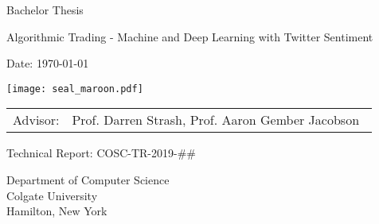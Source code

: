 \documentclass[../thesis.tex]{subfiles}
\begin{document}
\pagestyle{empty}

\begin{titlepage}
	\begin{center}\large

		\vfill
		\vfill
		\vfill
		\vfill

		Bachelor Thesis
		\vspace*{1.35cm}

		{\bfseries{\Large{Algorithmic Trading - Machine and Deep Learning with Twitter Sentiment \par}}}

		\vspace*{1.35cm}

		\theauthor

		\vspace*{6.0mm}

		Date: \today 

		\vspace*{6.0mm}

        \texttt{[image: seal\_maroon.pdf]}

		\vspace*{6.0mm}
		\begin{tabular}{rl}
			Advisor: & Prof. Darren Strash, Prof. Aaron Gember Jacobson\
		\end{tabular}

		\vspace*{7mm}

        Technical Report: COSC-TR-2019-\#\#


		\vspace*{7mm}
		Department of Computer Science \\
		Colgate University \\
		Hamilton, New York

		\vspace*{12mm}
		\vfill
	\end{center}

\end{titlepage}
\end{document}
